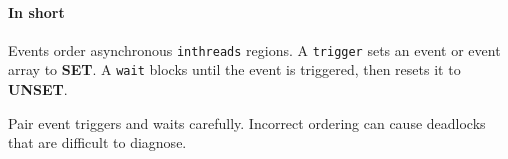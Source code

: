 \paragraph*{In short}

Events order asynchronous \texttt{inthreads} regions. A \texttt{trigger} sets an event or event array to \textbf{SET}. A \texttt{wait} blocks until the event is triggered, then resets it to \textbf{UNSET}.

Pair event triggers and waits carefully. Incorrect ordering can cause deadlocks that are difficult to diagnose.
